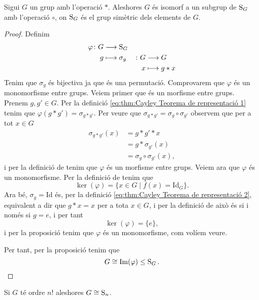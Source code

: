 \documentclass[../Apunts.tex]{subfiles}
\begin{document}
	\begin{theorem}
		\label{thm:Cayley Teorema de representació}
		Sigui \(G\) un grup amb l'operació \(\ast\). Aleshores \(G\) és isomorf a un subgrup de \(\operatorname{S}_{G}\) amb l'operació \(\circ\), on \(\operatorname{S}_{G}\) és el grup simètric dels elements de \(G\). %
		\begin{proof}
			Definim
			\begin{alignat}{2}
			\varphi\colon G&\longrightarrow\operatorname{S}_{G}&&\label{eq:thm:Cayley Teorema de representació 1}\\
			g&\longmapsto\sigma_{g}&\colon G&\longrightarrow G\label{eq:thm:Cayley Teorema de representació 2}\\
			&&x&\longmapsto g\ast x\nonumber
			\end{alignat}
			Tenim que \(\sigma_{g}\) és bijectiva ja que és una permutació. %
			Comprovarem que \(\varphi\) és un monomorfisme entre grups. Veiem primer que és un morfisme entre grups. Prenem \(g,g'\in G\). Per la definició \eqref{eq:thm:Cayley Teorema de representació 1} tenim que \(\varphi(g\ast g')=\sigma_{g\ast g'}\). Per veure que \(\sigma_{g\ast g'}=\sigma_{g}\circ\sigma_{g'}\) observem que per a tot \(x\in G\)
			\begin{align*}
			\sigma_{g\ast g'}(x)&=g\ast g'\ast x\\
			&=g\ast\sigma_{g'}(x)\\
			&=\sigma_{g}\circ\sigma_{g'}(x),
			\end{align*}
			i per la definició de  tenim que \(\varphi\) és un morfisme entre grups. Veiem ara que \(\varphi\) és un monomorfisme. Per la definició de  tenim que
			\[\ker(\varphi)=\{x\in G\mid f(x)=\text{Id}_{G}\}.\]
			Ara bé, \(\sigma_{g}=\text{Id}\) és, per la definició \eqref{eq:thm:Cayley Teorema de representació 2}, equivalent a dir que \(g\ast x=x\) per a tota \(x\in G\), i per la definició de  això és si i només si \(g=e\), i per tant
			\[\ker(\varphi)=\{e\},\]
			i per la proposició  tenim que \(\varphi\) és un monomorfisme, com volíem veure.
			
			Per tant, per la proposició  tenim que
			\[G\cong \operatorname*{Im}(\varphi)\leq\operatorname{S}_{G}.\qedhere\]
		\end{proof}
	\end{theorem}
	\begin{corollary}
		Si \(G\) té ordre \(n!\) aleshores \(G\cong\operatorname{S}_{n}\).
	\end{corollary}
\end{document}
